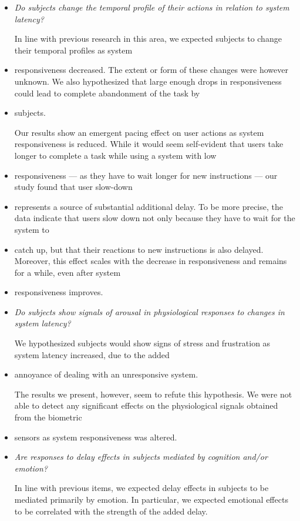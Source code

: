 \begin{itemize}
    \item \emph{Do subjects change the temporal profile of their actions in relation to system latency?}

    In line with previous research in this area, we expected subjects to change their temporal profiles as system
    \item responsiveness decreased.
    The extent or form of these changes were however unknown.
    We also hypothesized that large enough drops in responsiveness could lead to complete abandonment of the task by
    \item subjects.

    Our results show an emergent pacing effect on user actions as system responsiveness is reduced.
    While it would seem self-evident that users take longer to complete a task while using a system with low
    \item responsiveness --- as they have to wait longer for new instructions --- our study found that user slow-down
    \item represents a source of substantial additional delay.
    To be more precise, the data indicate that users slow down not only because they have to wait for the system to
    \item catch up, but that their reactions to new instructions is also delayed.
    Moreover, this effect scales with the decrease in responsiveness and remains for a while, even after system
    \item responsiveness improves.

    \item \emph{Do subjects show signals of arousal in physiological responses to changes in system latency?}

    We hypothesized subjects would show signs of stress and frustration as system latency increased, due to the added
    \item annoyance of dealing with an unresponsive system.

    The results we present, however, seem to refute this hypothesis.
    We were not able to detect any significant effects on the physiological signals obtained from the biometric
    \item sensors as system responsiveness was altered.

    \item \emph{Are responses to delay effects in subjects mediated by cognition and/or emotion?}

    In line with previous items, we expected delay effects in subjects to be mediated primarily by emotion.
    In particular, we expected emotional effects to be correlated with the strength of the added delay.


\end{itemize}
